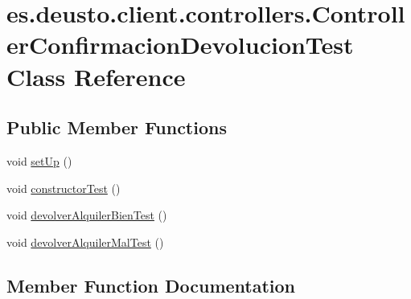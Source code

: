 \hypertarget{classes_1_1deusto_1_1client_1_1controllers_1_1_controller_confirmacion_devolucion_test}{}\section{es.\+deusto.\+client.\+controllers.\+Controller\+Confirmacion\+Devolucion\+Test Class Reference}
\label{classes_1_1deusto_1_1client_1_1controllers_1_1_controller_confirmacion_devolucion_test}
\subsection*{Public Member Functions}
\begin{DoxyCompactItemize}
\item 
void \mbox{\hyperlink{classes_1_1deusto_1_1client_1_1controllers_1_1_controller_confirmacion_devolucion_test_aa5d47a6e8c3aeb20f2624a8e5681ba63}{set\+Up}} ()
\item 
void \mbox{\hyperlink{classes_1_1deusto_1_1client_1_1controllers_1_1_controller_confirmacion_devolucion_test_a89dea8390cfd91477c4867a682c26a3f}{constructor\+Test}} ()
\item 
void \mbox{\hyperlink{classes_1_1deusto_1_1client_1_1controllers_1_1_controller_confirmacion_devolucion_test_af24e71152e04097ab07c608aebaf6981}{devolver\+Alquiler\+Bien\+Test}} ()
\item 
void \mbox{\hyperlink{classes_1_1deusto_1_1client_1_1controllers_1_1_controller_confirmacion_devolucion_test_a31834a38a823dad9e3f51f71eb8ad316}{devolver\+Alquiler\+Mal\+Test}} ()
\end{DoxyCompactItemize}


\subsection{Member Function Documentation}
\mbox{\label{classes_1_1deusto_1_1client_1_1controllers_1_1_controller_confirmacion_devolucion_test_a89dea8390cfd91477c4867a682c26a3f}} 
